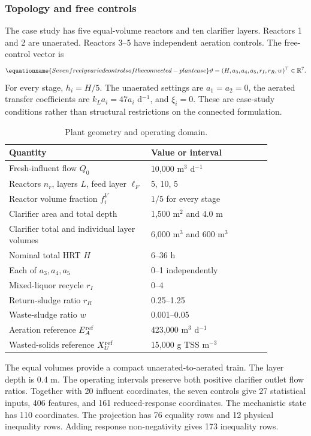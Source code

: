 \subsubsection{Topology and free controls}

The case study has five equal-volume reactors and ten clarifier layers. Reactors 1 and 2 are unaerated. Reactors 3--5 have independent aeration controls. The free-control vector is
\begin{equation}
\equationname{Seven freely varied controls of the connected-plant case}
\vartheta=(H,a_3,a_4,a_5,r_I,r_R,w)^\top\in\mathbb R^7.
\label{eq:plant_case_controls}
\end{equation}
For every stage, $h_i=H/5$. The unaerated settings are $a_1=a_2=0$, the aerated transfer coefficients are $k_La_i=47a_i$ d$^{-1}$, and $\xi_i=0$. These are case-study conditions rather than structural restrictions on the connected formulation.

\begin{table}[htbp]
\centering\small
\caption{Plant geometry and operating domain.}
\label{tab:plant_operating_domain}
\begin{tabular}{p{0.47\linewidth}p{0.40\linewidth}}
\toprule
Quantity & Value or interval\\
\midrule
Fresh-influent flow $Q_0$ & 10{,}000 m$^3$ d$^{-1}$\\
Reactors $n_r$, layers $L$, feed layer $\ell_F$ & 5, 10, 5\\
Reactor volume fraction $f_i^V$ & $1/5$ for every stage\\
Clarifier area and total depth & 1{,}500 m$^2$ and 4.0 m\\
Clarifier total and individual layer volumes & 6{,}000 m$^3$ and 600 m$^3$\\
Nominal total HRT $H$ & 6--36 h\\
Each of $a_3,a_4,a_5$ & 0--1 independently\\
Mixed-liquor recycle $r_I$ & 0--4\\
Return-sludge ratio $r_R$ & 0.25--1.25\\
Waste-sludge ratio $w$ & 0.001--0.05\\
Aeration reference $E_A^{\rm ref}$ & 423{,}000 m$^3$ d$^{-1}$\\
Wasted-solids reference $X_U^{\rm ref}$ & 15{,}000 g TSS m$^{-3}$\\
\bottomrule
\end{tabular}
\end{table}

The equal volumes provide a compact unaerated-to-aerated train. The layer depth is 0.4 m. The operating intervals preserve both positive clarifier outlet flow ratios. Together with 20 influent coordinates, the seven controls give 27 statistical inputs, 406 features, and 161 reduced-response coordinates. The mechanistic state has 110 coordinates. The projection has 76 equality rows and 12 physical inequality rows. Adding response non-negativity gives 173 inequality rows.

